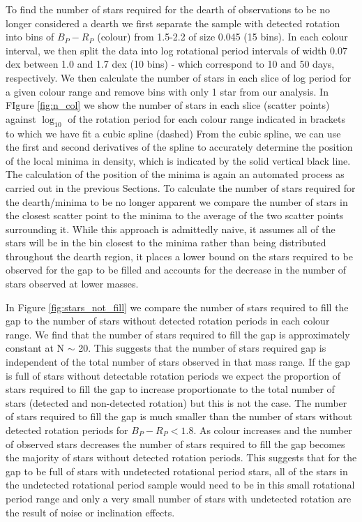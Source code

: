 To find the number of stars required for the dearth of observations to be no longer considered a dearth we first separate the sample with detected rotation into bins of $B_P - R_P$ (colour) from 1.5-2.2 of size 0.045 (15 bins).
In each colour interval, we then split the data into log rotational period intervals of width 0.07 dex between 1.0 and 1.7 dex (10 bins) - which correspond to 10 and 50 days, respectively.
We then calculate the number of stars in each slice of log period for a given colour range and remove bins with only 1 star from our analysis.
In FIgure \ref{fig:n_col} we show the number of stars in each slice (scatter points) against $\log_{10}$ of the rotation period for each colour range indicated in brackets to which we have fit a cubic spline (dashed)
From the cubic spline, we can use the first and second derivatives of the spline to accurately determine the position of the local minima in density, which is indicated by the solid vertical black line.
The calculation of the position of the minima is again an automated process as carried out in the previous Sections.
To calculate the number of stars required for the dearth/minima to be no longer apparent we compare the number of stars in the closest scatter point to the minima to the average of the two scatter points surrounding it.
While this approach is admittedly naive, it assumes all of the stars will be in the bin closest to the minima rather than being distributed throughout the dearth region, it places a lower bound on the stars required to be observed for the gap to be filled and accounts for the decrease in the number of stars observed at lower masses.

In Figure \ref{fig:stars_not_fill} we compare the number of stars required to fill the gap to the number of stars without detected rotation periods in each colour range.
We find that the number of stars required to fill the gap is approximately constant at N $\sim$ 20.
This suggests that the number of stars required gap is independent of the total number of stars observed in that mass range.
If the gap is full of stars without detectable rotation periods we expect the proportion of stars required to fill the gap to increase proportionate to the total number of stars (detected and non-detected rotation) but this is not the case.
The number of stars required to fill the gap is much smaller than the number of stars without detected rotation periods for $B_P-R_P<1.8$.
As colour increases and the number of observed stars decreases the number of stars required to fill the gap becomes the majority of stars without detected rotation periods.
This suggests that for the gap to be full of stars with undetected rotational period stars, all of the stars in the undetected rotational period sample would need to be in this small rotational period range and only a very small number of stars with undetected rotation are the result of noise or inclination effects.


